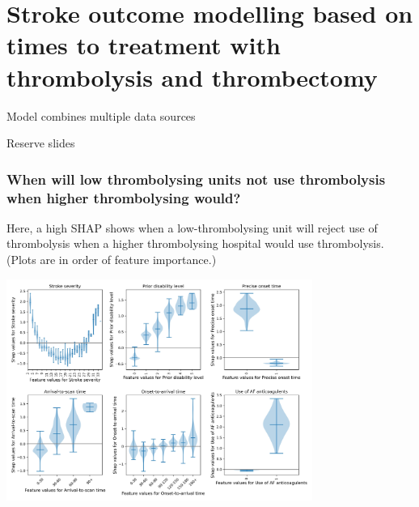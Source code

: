 \documentclass{beamer}
\begin{document}

\section{Stroke outcome modelling based on times to treatment with thrombolysis and thrombectomy}




\begin{frame}{Model combines multiple data sources}


    
\end{frame}







\begin{frame}{Reserve slides}
    
\end{frame}


\begin{frame}
\frametitle{When will low thrombolysing units not use thrombolysis when higher thrombolysing would?}

\footnotesize{Here, a high SHAP shows when a low-thrombolysing unit will reject use of thrombolysis when a higher thrombolysing hospital would use thrombolysis. (Plots are in order of feature importance.)}

\begin{center}
\includegraphics[width=0.75\textwidth]{./images/xgb_predicting_difference_shap_violin.jpg}
\end{center}
\end{frame}
\end{document}
